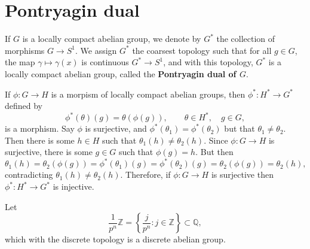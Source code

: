 \documentclass{article}
\theoremstyle{definition}
\begin{document}
\section{Pontryagin dual}
If $G$ is a locally compact abelian group, we denote
by $G^*$ the collection of morphisms $G \to S^1$. We assign $G^*$ the coarsest topology such that for all
$g \in G$, the map $\gamma \mapsto \gamma(x)$ is continuous $G^* \to S^1$, and with this topology, $G^*$ is a locally compact
abelian group, called the \textbf{Pontryagin dual of $G$}.

If $\phi:G \to H$ is a morpism of locally compact abelian groups, then $\phi^*:H^* \to G^*$ defined by
\[
\phi^*(\theta)(g) = \theta(\phi(g)), \qquad \theta \in H^*, \quad g\in G,
\]
is a morphism. Say $\phi$ is surjective, and  $\phi^*(\theta_1)=\phi^*(\theta_2)$ but that $\theta_1 \neq \theta_2$. Then there
is some $h \in H$ such that $\theta_1(h) \neq \theta_2(h)$. Since $\phi:G \to H$ is surjective, there is some $g \in G$ such that
$\phi(g)=h$. But then
\[
\theta_1(h) = \theta_2(\phi(g))=\phi^*(\theta_1)(g) = \phi^*(\theta_2)(g) = \theta_2(\phi(g)) = \theta_2(h),
\]
contradicting $\theta_1(h) \neq \theta_2(h)$. Therefore, if $\phi:G \to H$ is surjective then $\phi^*:H^* \to G^*$ is injective.

Let
\[
\frac{1}{p^n} \mathbb{Z} = \left\{ \frac{j}{p^n}: j \in \mathbb{Z} \right\} \subset \mathbb{Q},
\]
which with the discrete topology is a discrete abelian group. 
\end{document}
